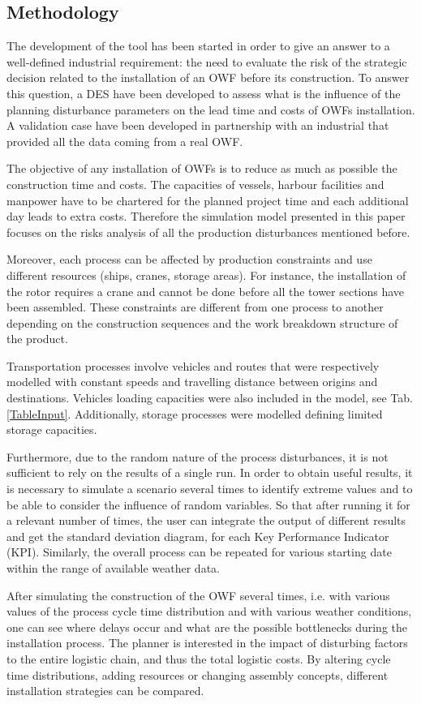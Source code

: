 \subsection{Methodology}
The development of the tool has been started in order to give an answer to a well-defined industrial requirement: the need to evaluate the risk of the strategic decision related to the installation of an OWF before its construction. To answer this question, a DES have been developed to assess what is the influence of the planning disturbance parameters on the lead time and costs of OWFs installation. A validation case have been developed in partnership with an industrial that provided all the data coming from a real OWF.

The objective of any installation of OWFs is to reduce as much as possible the construction time and costs. The capacities of vessels, harbour facilities and manpower have to be chartered for the planned project time and each additional day leads to extra costs. Therefore the simulation model presented in this paper focuses on the risks analysis of all the production disturbances mentioned before.



Moreover, each process can be affected by production constraints and use different resources (ships, cranes, storage areas). For instance, the installation of the rotor requires a crane and cannot be done before all the tower sections have been assembled. These constraints are different from one process to another depending on the construction sequences and the work breakdown structure of the product.

Transportation processes involve vehicles and routes that were respectively modelled with constant speeds and travelling distance between origins and destinations. Vehicles loading capacities were also included in the model, see Tab. \ref{TableInput}. Additionally, storage processes were modelled defining limited storage capacities.

Furthermore, due to the random nature of the process disturbances, it is not sufficient to rely on the results of a single run. In order to obtain useful results, it is necessary to simulate a scenario several times to identify extreme values and to be able to consider the influence of random variables. So that after running it for a relevant number of times, the user can integrate the output of different results and get the standard deviation diagram, for each Key Performance Indicator (KPI). Similarly, the overall process can be repeated for various starting date within the range of available weather data.

After simulating the construction of the OWF several times, i.e. with various values of the process cycle time distribution and with various weather conditions, one can see where delays occur and what are the possible bottlenecks during the installation process. The planner is interested in the impact of disturbing factors to the entire logistic chain, and thus the total logistic costs. By altering cycle time distributions, adding resources or changing assembly concepts, different installation strategies can be compared.
